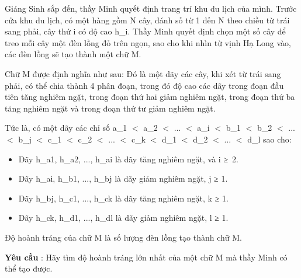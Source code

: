 Giáng Sinh sắp đến, thầy Minh quyết định trang trí khu du lịch của mình. Trước cửa khu du lịch, có một hàng gồm N cây, đánh số từ 1 đến N theo chiều từ trái sang phải, cây thứ i có độ cao h\_i. Thầy Minh quyết định chọn một số cây để treo mỗi cây một đèn lồng đỏ trên ngọn, sao cho khi nhìn từ vịnh Hạ Long vào, các đèn lồng sẽ tạo thành một chữ M.  

   Chữ M được định nghĩa như sau: Đó là một dãy các cây, khi xét từ trái sang phải, có thể chia thành 4 phân đoạn, trong đó độ cao các dãy trong đoạn đầu tiên tăng nghiêm ngặt, trong đoạn thứ hai giảm nghiêm ngặt, trong đoạn thứ ba tăng nghiêm ngặt và trong đoạn thứ tư giảm nghiêm ngặt.  

   Tức là, có một dãy các chỉ số a\_1 $<$ a\_2 $<$ ... $<$ a\_i $<$ b\_1 $<$ b\_2 $<$ ... $<$ b\_j $<$ c\_1 $<$ c\_2 $<$ ... $<$ c\_k $<$ d\_1 $<$ d\_2 $<$ ... $<$ d\_l sao cho:  
\begin{itemize}
	\item     Dãy h\_a1, h\_a2, ..., h\_ai là dãy tăng nghiêm ngặt, và i ≥ 2.   
	\item     Dãy h\_ai, h\_b1, ..., h\_bj là dãy giảm nghiêm ngặt, j         ≥        1.   
	\item     Dãy h\_bj, h\_c1, ..., h\_ck là dãy tăng nghiêm ngặt, k         ≥ 1.    
	\item      Dãy h\_ck, h\_d1, ..., h\_dl là dãy giảm nghiêm ngặt, l           ≥ 1.     
\end{itemize}

   Độ hoành tráng của chữ M là số lượng đèn lồng tạo thành chữ M.  

\textbf{    Yêu cầu   }   : Hãy tìm độ hoành tráng lớn nhất của một chữ M mà thầy Minh có thể tạo được.